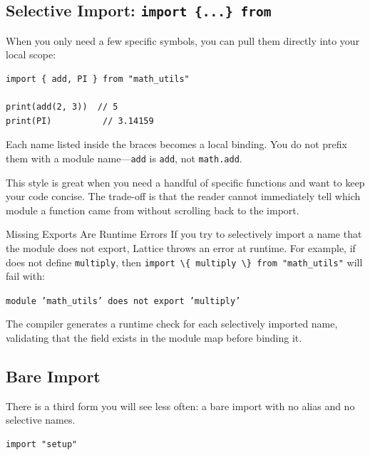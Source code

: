 \subsection{Selective Import: \texttt{import \{...\} from}}\label{subsec:import-from}

When you only need a few specific symbols, you can pull them directly into your local scope:

\begin{lstlisting}[language=Lattice, caption={Selective import}]
import { add, PI } from "math_utils"

print(add(2, 3))  // 5
print(PI)          // 3.14159
\end{lstlisting}

Each name listed inside the braces becomes a local binding.
You do not prefix them with a module name---\lstinline|add| is \lstinline|add|, not \lstinline|math.add|.

This style is great when you need a handful of specific functions and want to keep your code concise.
The trade-off is that the reader cannot immediately tell which module a function came from without scrolling back to the import.

\begin{warnbox}{Missing Exports Are Runtime Errors}
If you try to selectively import a name that the module does not export, Lattice throws an error at runtime.
For example, if  does not define \lstinline|multiply|, then \lstinline|import \{ multiply \} from "math_utils"| will fail with:

\medskip
\texttt{module 'math\_utils' does not export 'multiply'}
\medskip

The compiler generates a runtime check for each selectively imported name, validating that the field exists in the module map before binding it.
\end{warnbox}

\subsection{Bare Import}\label{subsec:bare-import}

There is a third form you will see less often: a bare import with no alias and no selective names.

\begin{lstlisting}[language=Lattice, caption={Bare import --- side effects only}]
import "setup"
\end{lstlisting}

